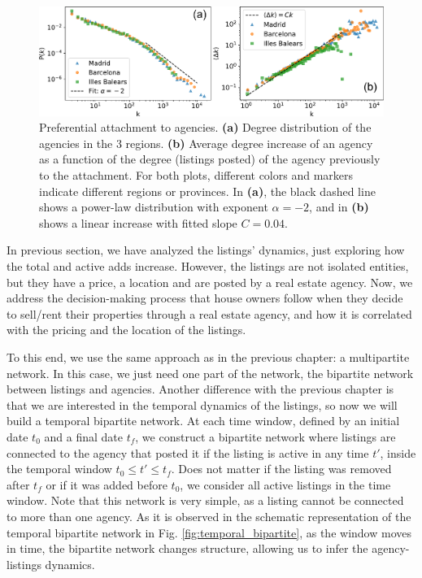 \begin{figure}
    \centering
    \includegraphics[width =\textwidth]{Figs/Idealista_dynamics/panel_degree.pdf}
	\caption[Preferential attachment to agencies.]{\label{fig:panel_degree}Preferential attachment to agencies. \textbf{(a)} Degree distribution of the agencies in the 3 regions. \textbf{(b)} Average degree increase of an agency as a function of the degree (listings posted) of the agency previously to the attachment. For both plots, different colors and markers indicate different regions or provinces. In \textbf{(a)}, the black dashed line shows a power-law distribution with exponent $\alpha  =-2$, and in \textbf{(b)} shows a linear increase with fitted slope $C = 0.04$.}
\end{figure}

In previous section, we have analyzed the listings' dynamics, just exploring how the total and active adds increase. However, the listings are not isolated entities, but they have a price, a location and are posted by a real estate agency. Now, we address the decision-making process that house owners follow when they decide to sell/rent their properties through a real estate agency, and how it is correlated with the pricing and the location of the listings.

To this end, we use the same approach as in the previous chapter: a multipartite network. In this case, we just need one part of the network, the bipartite network between listings and agencies. Another difference with the previous chapter is that we are interested in the temporal dynamics of the listings, so now we will build a temporal bipartite network. At each time window, defined by an initial date $t_0$ and a final date $t_f$, we construct a bipartite network where listings are connected to the agency that posted it if the listing is active in any time $t'$, inside the temporal window $t_0 \leq t' \leq t_f$. Does not matter if the listing was removed after $t_f$ or if it was added before $t_0$, we consider all active listings in the time window. Note that this network is very simple, as a listing cannot be connected to more than one agency. As it is observed in the schematic representation of the temporal bipartite network in Fig. \ref{fig:temporal_bipartite}, as the window moves in time, the bipartite network changes structure, allowing us to infer the agency-listings dynamics.

